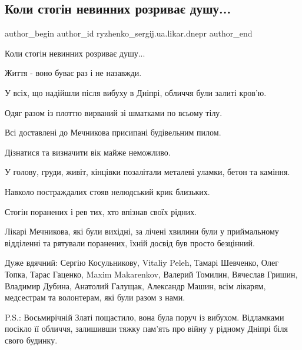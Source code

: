  
 
 
 
 

\subsection{Коли стогін невинних розриває душу...}
\label{sec:15_01_2023.fb.ryzhenko_sergij.ua.likar.dnepr.1.koli_stog_n_nevinnik}

\ifcmt
 author_begin
   author_id ryzhenko_sergij.ua.likar.dnepr
 author_end
\fi

Коли стогін невинних розриває душу...

Життя - воно буває раз і не назавжди.

У всіх, що надійшли після вибуху в Дніпрі, обличчя були залиті кров'ю.

Одяг разом із плоттю вирваний зі шматками по всьому тілу.

Всі доставлені до Мечникова присипані будівельним пилом.

Дізнатися та визначити вік майже неможливо.

У голову, груди, живіт, кінцівки позалітали металеві уламки, бетон та каміння.

Навколо постраждалих стояв нелюдський крик близьких.

Стогін поранених і рев тих, хто впізнав своїх рідних.

Лікарі Мечникова, які були вихідні, за лічені хвилини були у приймальному
відділенні та рятували поранених, їхній досвід був просто безцінний.

Дуже вдячний: Сергію Косульникову, Vitaliy Peleh, Тамарі Шевченко, Олег Топка,
Тарас Гаценко, Maxim  Makarenkov, Валерий Томилин, Вячеслав Гришин, Владимир
Дубина, Анатолий Галущак, Александр Машин, всім лікарям, медсестрам та
волонтерам, які були разом з нами.

P.S.: Восьмирічній Златі пощастило, вона була поруч із вибухом. Відламками
посікло її обличчя, залишивши тяжку пам'ять про війну у рідному Дніпрі біля
свого будинку.

